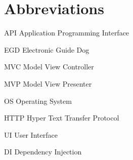     \newcommand{\abbrlabel}[1]{\makebox[3cm][l]{\textbf{#1}\ }}
\newenvironment{abbreviations}{\begin{list}{}{\renewcommand{\makelabel}{\abbrlabel}}}{\end{list}}
%

\newpage
\section*{Abbreviations}
\begin{abbreviations}
\item[API] Application Programming Interface
\item[EGD] Electronic Guide Dog
\item[MVC] Model View Controller
\item[MVP] Model View Presenter
\item[OS] Operating System
\item[HTTP] Hyper Text Transfer Protocol
\item[UI] User Interface
\item[DI] Dependency Injection
\end{abbreviations}
%